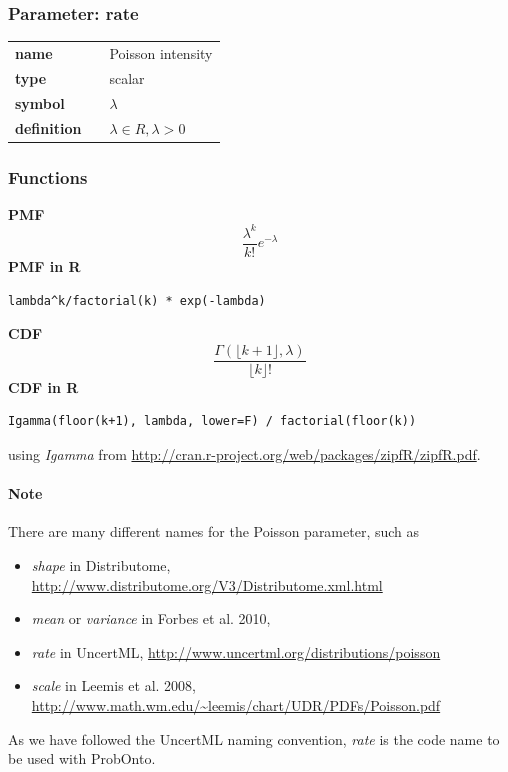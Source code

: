 \subsubsection*{Parameter: rate}

\noindent\begin{tabular}{p{2cm}cl}
\textbf{name} & & Poisson intensity \\
\textbf{type} & & scalar \\
\textbf{symbol} & & $\lambda$  \\
\textbf{definition} & & $\lambda \in R, \lambda > 0$
\end{tabular}
\subsubsection*{Functions}

\smallskip \noindent \hspace{.2cm} \textbf{PMF} 
\begin{equation*}\frac{\lambda^k}{k!}e^{-\lambda}\end{equation*}
\smallskip \noindent \hspace{.2cm} \textbf{PMF in R}  
\begin{verbatim}lambda^k/factorial(k) * exp(-lambda)\end{verbatim}
\smallskip \noindent \hspace{.2cm} \textbf{CDF} 
\begin{equation*}\frac{\Gamma(\lfloor k+1 \rfloor,\lambda)}{\lfloor k \rfloor!}\end{equation*}
\smallskip \noindent \hspace{.2cm} \textbf{CDF in R} 
\begin{verbatim}Igamma(floor(k+1), lambda, lower=F) / factorial(floor(k))\end{verbatim}
using \emph{Igamma} from \url{http://cran.r-project.org/web/packages/zipfR/zipfR.pdf}.

\paragraph{Note} There are many different names for the Poisson parameter, such as
\label{par:poissonParameterNames}
\begin{itemize}
\item 
\emph{shape} in Distributome, \url{http://www.distributome.org/V3/Distributome.xml.html}
\item 
\emph{mean} or \emph{variance} in Forbes et al. 2010, \cite{Forbes:2010jk}
\item 
\emph{rate} in UncertML, \url{http://www.uncertml.org/distributions/poisson}
\item 
\emph{scale} in Leemis et al. 2008, \url{http://www.math.wm.edu/~leemis/chart/UDR/PDFs/Poisson.pdf}
\end{itemize}
As we have followed the UncertML naming convention, \emph{rate} is the 
code name to be used with ProbOnto.


